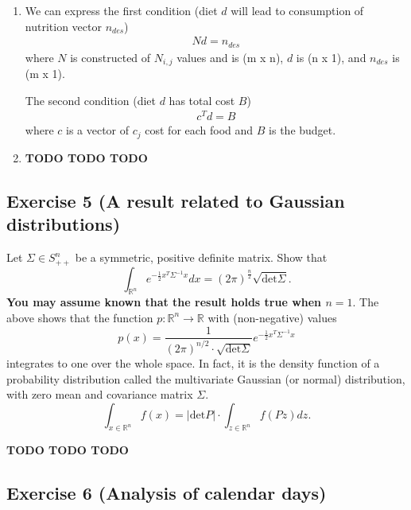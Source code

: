 \documentclass[11pt]{article}
\begin{document}
\begin{solution}
\begin{enumerate}
    \item We can express the first condition (diet $d$ will lead to consumption of nutrition vector $n_{des}$)
        \begin{align*}
            N d = n_{des}
        \end{align*}
        where $N$ is constructed of $N_{i,j}$ values and is (m x n), $d$ is (n x 1), and $n_{des}$ is (m x 1).

        The second condition (diet $d$ has total cost $B$)
        \begin{align*}
            c^T d = B
        \end{align*}
        where $c$ is a vector of $c_j$ cost for each food and $B$ is the budget.

    \item \textbf{TODO TODO TODO}
\end{enumerate}
\end{solution}

\newpage
\subsection*{Exercise 5 (A result related to Gaussian distributions)}

Let $\Sigma \in S^n_{++}$ be a symmetric, positive definite matrix. Show that
$$
\int_{\mathbb{R}^n} e^{-\frac{1}{2}x^T \Sigma^{-1} x} dx
= (2 \pi)^{\frac{n}{2}} \sqrt{\text{det} \Sigma}.
$$
\textbf{You may assume known that the result holds true when $n = 1$}. The above shows that the function $p : \mathbb{R}^n \rightarrow \mathbb{R}$ with (non-negative) values
$$
p(x) = \frac{1}{(2\pi)^{n/2} \cdot \sqrt{\text{det} \Sigma}} e^{-\frac{1}{2} x^T \Sigma^{-1} x}
$$
integrates to one over the whole space. In fact, it is the density function of a probability distribution called the multivariate Gaussian (or normal) distribution, with zero mean and covariance matrix $\Sigma$.
$$
\int_{x \in \mathbb{R}^n} f(x)
=
|\text{det} P| \cdot \int_{z \in \mathbb{R}^n} f(Pz) dz.
$$

\begin{solution}
\textbf{TODO TODO TODO}
\end{solution}

\newpage
\subsection*{Exercise 6 (Analysis of calendar days)}
\end{document}
